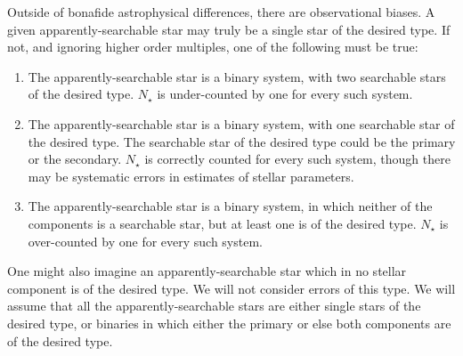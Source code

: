 \documentclass{emulateapj}
\begin{document}
Outside of bonafide astrophysical differences, there are observational biases.
A given apparently-searchable star may truly be a single star of the desired 
type. If not, and ignoring higher order multiples, one of the following must 
be true:
\begin{enumerate}	
\item The apparently-searchable star is a binary system, with two searchable 
stars of the desired type. $N_\star$ is under-counted by one for every such 
system.
%
\item The apparently-searchable star is a binary system, with one searchable 
star of the desired type. 
The searchable star of the desired type could be the primary or the secondary.
$N_\star$ is correctly counted for every such system, though there may be 
systematic errors in estimates of stellar parameters.
%
\item  The apparently-searchable star is a binary system, in which neither of 
the components is a searchable star, but at least one is of the desired type. 
$N_\star$ is over-counted by one for every such system.
\end{enumerate}

One might also imagine an apparently-searchable star which in no stellar 
component is of the desired type.
We will not consider errors of this type.  We will assume that all the 
apparently-searchable stars are either single stars of
the desired type, or binaries in which either the primary or else both 
components are of the desired type.
\end{document}
